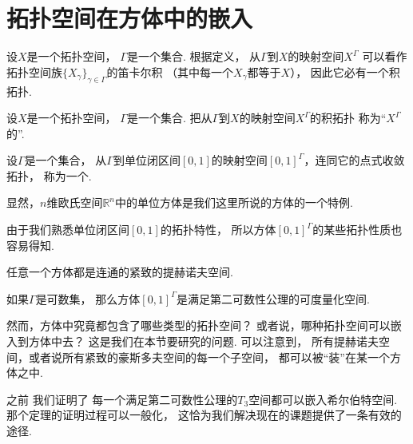 \section{拓扑空间在方体中的嵌入}
设\(X\)是一个拓扑空间，
\(\Gamma\)是一个集合.
根据定义，
从\(\Gamma\)到\(X\)的映射空间\(X^\Gamma\)
可以看作拓扑空间族\(\{X_\gamma\}_{\gamma \in \Gamma}\)的笛卡尔积
（其中每一个\(X_\gamma\)都等于\(X\)），
因此它必有一个积拓扑.

\begin{definition}
设\(X\)是一个拓扑空间，
\(\Gamma\)是一个集合.
把从\(\Gamma\)到\(X\)的映射空间\(X^\Gamma\)的积拓扑
称为“\(X^\Gamma\)的”.
\end{definition}

\begin{definition}
设\(\Gamma\)是一个集合，
从\(\Gamma\)到单位闭区间\([0,1]\)的映射空间\([0,1]^\Gamma\)，连同它的点式收敛拓扑，
称为一个.
\end{definition}

显然，\(n\)维欧氏空间\(\mathbb{R}^n\)中的单位方体是我们这里所说的方体的一个特例.

由于我们熟悉单位闭区间\([0,1]\)的拓扑特性，
所以方体\([0,1]^\Gamma\)的某些拓扑性质也容易得知.

\begin{proposition}
任意一个方体都是连通的紧致的提赫诺夫空间.
\end{proposition}

\begin{proposition}
如果\(\Gamma\)是可数集，
那么方体\([0,1]^\Gamma\)是满足第二可数性公理的可度量化空间.
\end{proposition}

然而，方体中究竟都包含了哪些类型的拓扑空间？
或者说，哪种拓扑空间可以嵌入到方体中去？
这是我们在本节要研究的问题.
可以注意到，
所有提赫诺夫空间，或者说所有紧致的豪斯多夫空间的每一个子空间，
都可以被“装”在某一个方体之中.

之前  %
我们证明了
每一个满足第二可数性公理的\(T_3\)空间都可以嵌入希尔伯特空间.
那个定理的证明过程可以一般化，
这恰为我们解决现在的课题提供了一条有效的途径.

